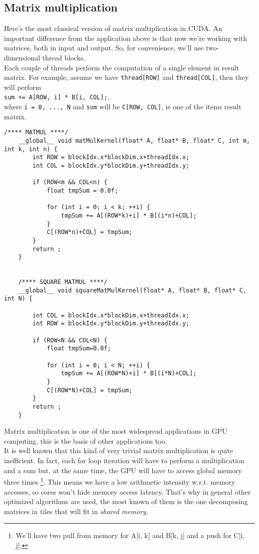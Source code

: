 \subsection{Matrix multiplication}
	Here's the most classical version of matrix multiplication in CUDA.
    An important difference from the application above is that now we're working with matrices, both in input and output. So, for convenience, we'll use two-dimensional thread blocks.\\  
	Each couple of threads perform the computation of a single element in result matrix. For example, assume we have \texttt{thread[ROW]} and \texttt{thread[COL]}, then they will perform\\ \texttt{sum += A[ROW, i] * B[i, COL];},\\ where \texttt{i = 0, ..., N} and \texttt{sum} will be \texttt{C[ROW, COL]}, ie one of the items result matrix.
	\begin{lstlisting}[caption={Implementation for Matrix Multiplication Kernel, both non-square and square}]
	/**** MATMUL ****/
	__global__ void matMulKernel(float* A, float* B, float* C, int m, int k, int n) {   
		int ROW = blockIdx.x*blockDim.x+threadIdx.x;
		int COL = blockIdx.y*blockDim.y+threadIdx.y;
		
		if (ROW<m && COL<n) {
			float tmpSum = 0.0f;			
	
			for (int i = 0; i < k; ++i) {
				tmpSum += A[(ROW*k)+i] * B[(i*n)+COL];
			}        
			C[(ROW*n)+COL] = tmpSum;
		}
		return ;
	}
	
		
	/**** SQUARE MATMUL ****/
	__global__ void squareMatMulKernel(float* A, float* B, float* C, int N) {

		int COL = blockIdx.x*blockDim.x+threadIdx.x;
		int ROW = blockIdx.y*blockDim.y+threadIdx.y;
		
		if (ROW<N && COL<N) {
			float tmpSum=0.0f;        
		
			for (int i = 0; i < N; ++i) {
				tmpSum += A[(ROW*N)+i] * B[(i*N)+COL];
			}        
			C[(ROW*N)+COL] = tmpSum;        
		}
		return ;
	}
	\end{lstlisting}
	Matrix multiplication is one of the most widespread applications in GPU computing, this is the basis of other applications too.\\
	It is well known that this kind of very trivial matrix multiplication is quite inefficient. In fact, each for loop iteration will have to perform a multiplication and a sum but, at the same time, the GPU will have to access global memory three times \footnote{We'll have two pull from memory for A[i, k] and B[k, j] and a push for C[i, j].}.
	This means we have a low arithmetic intensity w.r.t. memory accesses, so cores won't hide memory access latency.
	That's why in general other optimized algorithms are used, the most known of them is the one decomposing matrices in tiles that will fit in \textit{shared memory}.
	
